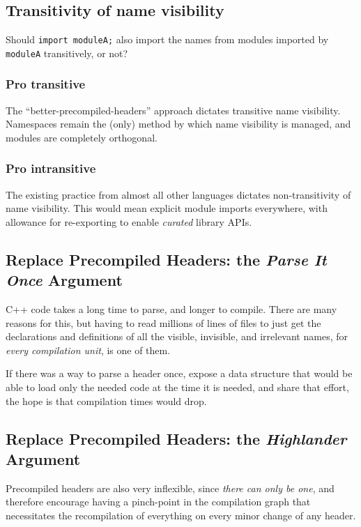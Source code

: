 \documentclass[reqno]{article}
\begin{document}
\subsection{Transitivity of name visibility}

Should \texttt{import moduleA;} also import the names from modules imported by
\texttt{moduleA} transitively, or not?

\subsubsection{Pro transitive}

The ``better-precompiled-headers'' approach dictates transitive name
visibility. Namespaces remain the (only) method by which name visibility is
managed, and modules are completely orthogonal.

\subsubsection{Pro intransitive}

The existing practice from almost all other languages dictates non-transitivity
of name visibility. This would mean explicit module imports everywhere, with
allowance for re-exporting to enable \emph{curated} library APIs.

\subsection{Replace Precompiled Headers: the \emph{Parse It Once} Argument}

C++ code takes a long time to parse, and longer to compile. There are many
reasons for this, but having to read millions of lines of files to just get the
declarations and definitions of all the visible, invisible, and irrelevant
names, for \emph{every compilation unit}, is one of them.

If there was a way to parse a header once, expose a data structure that would be
able to load only the needed code at the time it is needed, and share that
effort, the hope is that compilation times would drop.


\subsection{Replace Precompiled Headers: the \emph{Highlander} Argument}

Precompiled headers are also very inflexible, since \emph{there can only be
one}, and therefore encourage having a pinch-point in the compilation graph
that necessitates the recompilation of everything on every minor change of any
header.
\end{document}
